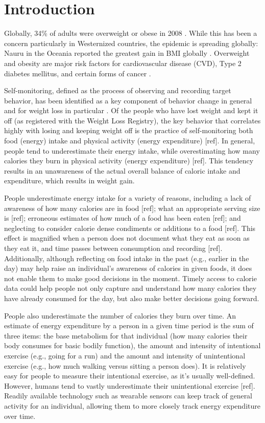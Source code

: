 \chapter {Introduction}
Globally, 34\% of adults were overweight or obese in 2008 \citep{kimokoti_diet_2011}. While this has been a concern particularly in Westernized countries, the epidemic is spreading globally: Nauru in the Oceania reported the greatest gain in BMI globally \citep{finucane_national_2011}. Overweight and obesity are major risk factors for cardiovascular disease (CVD), Type 2 diabetes mellitus, and certain forms of cancer \citep{guh_incidence_2009} \citep{calle_overweight_2004}. 



Self-monitoring, defined as the process of observing and recording target behavior, has been identified as a key component of behavior change in general \citep{kanfer_self-monitoring:_1970} and for weight loss in particular \citep{michie_effective_2009} \citep{burke_effect_2011}. Of the people who have lost weight and kept it off (as registered with the Weight Loss Registry), the key behavior that correlates highly with losing and keeping weight off is the practice of self-monitoring both food (energy) intake and physical activity (energy expenditure) [ref]. In general, people tend to underestimate their energy intake, while overestimating how many calories they burn in physical activity (energy expenditure) [ref]. This tendency results in an unawareness of the actual overall balance of caloric intake and expenditure, which results in weight gain. 

People underestimate energy intake for a variety of reasons, including a lack of awareness of how many calories are in food [ref]; what an appropriate serving size is [ref]; erroneous estimates of how much of a food has been eaten [ref]; and neglecting to consider calorie dense condiments or additions to a food [ref]. This effect is magnified when a person does not document what they eat as soon as they eat it, and time passes between consumption and recording [ref]. Additionally, although reflecting on food intake in the past (e.g., earlier in the day) may help raise an individual's awareness of calories in given foods, it does not enable them to make good decisions in the moment. Timely access to calorie data could help people not only capture and understand how many calories they have already consumed for the day, but also make better decisions going forward. 

People also underestimate the number of calories they burn over time. An estimate of energy expenditure by a person in a given time period is the sum of three items: the base metabolism for that individual (how many calories their body consumes for basic bodily function), the amount and intensity of intentional exercise (e.g., going for a run) and the amount and intensity of unintentional exercise (e.g., how much walking versus sitting a person does). It is relatively easy for people to measure their intentional exercise, as it's usually well-defined. However, humans tend to vastly underestimate their unintentional exercise [ref]. Readily available technology such as wearable sensors can keep track of general activity for an individual, allowing them to more closely track energy expenditure over time. 
